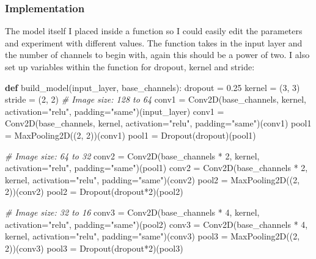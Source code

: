 \documentclass[11pt]{article}
\newenvironment{Shaded}{}{}
\newcommand{\KeywordTok}[1]{\textcolor[rgb]{0.00,0.44,0.13}{\textbf{{#1}}}}
\newcommand{\DecValTok}[1]{\textcolor[rgb]{0.25,0.63,0.44}{{#1}}}
\newcommand{\FloatTok}[1]{\textcolor[rgb]{0.25,0.63,0.44}{{#1}}}
\newcommand{\StringTok}[1]{\textcolor[rgb]{0.25,0.44,0.63}{{#1}}}
\newcommand{\CommentTok}[1]{\textcolor[rgb]{0.38,0.63,0.69}{\textit{{#1}}}}
\newcommand{\NormalTok}[1]{{#1}}
\newcommand{\OperatorTok}[1]{\textcolor[rgb]{0.40,0.40,0.40}{{#1}}}
\begin{document}
\subsubsection{Implementation}\label{implementation}

The model itself I placed inside a function so I could easily edit the
parameters and experiment with different values. The function takes in
the input layer and the number of channels to begin with, again this
should be a power of two. I also set up variables within the function
for dropout, kernel and stride:

\begin{Shaded}
\begin{Highlighting}[]
\KeywordTok{def}\NormalTok{ build_model(input_layer, base_channels):}
\NormalTok{    dropout }\OperatorTok{=} \FloatTok{0.25}
\NormalTok{    kernel }\OperatorTok{=}\NormalTok{ (}\DecValTok{3}\NormalTok{, }\DecValTok{3}\NormalTok{)}
\NormalTok{    stride }\OperatorTok{=}\NormalTok{ (}\DecValTok{2}\NormalTok{, }\DecValTok{2}\NormalTok{)}
    \CommentTok{# Image size: 128 to 64}
\NormalTok{    conv1 }\OperatorTok{=}\NormalTok{ Conv2D(base_channels, kernel, activation}\OperatorTok{=}\StringTok{"relu"}\NormalTok{, padding}\OperatorTok{=}\StringTok{"same"}\NormalTok{)(input_layer)}
\NormalTok{    conv1 }\OperatorTok{=}\NormalTok{ Conv2D(base_channels, kernel, activation}\OperatorTok{=}\StringTok{"relu"}\NormalTok{, padding}\OperatorTok{=}\StringTok{"same"}\NormalTok{)(conv1)}
\NormalTok{    pool1 }\OperatorTok{=}\NormalTok{ MaxPooling2D((}\DecValTok{2}\NormalTok{, }\DecValTok{2}\NormalTok{))(conv1)}
\NormalTok{    pool1 }\OperatorTok{=}\NormalTok{ Dropout(dropout)(pool1)}

    \CommentTok{# Image size: 64 to 32}
\NormalTok{    conv2 }\OperatorTok{=}\NormalTok{ Conv2D(base_channels }\OperatorTok{*} \DecValTok{2}\NormalTok{, kernel, activation}\OperatorTok{=}\StringTok{"relu"}\NormalTok{, padding}\OperatorTok{=}\StringTok{"same"}\NormalTok{)(pool1)}
\NormalTok{    conv2 }\OperatorTok{=}\NormalTok{ Conv2D(base_channels }\OperatorTok{*} \DecValTok{2}\NormalTok{, kernel, activation}\OperatorTok{=}\StringTok{"relu"}\NormalTok{, padding}\OperatorTok{=}\StringTok{"same"}\NormalTok{)(conv2)}
\NormalTok{    pool2 }\OperatorTok{=}\NormalTok{ MaxPooling2D((}\DecValTok{2}\NormalTok{, }\DecValTok{2}\NormalTok{))(conv2)}
\NormalTok{    pool2 }\OperatorTok{=}\NormalTok{ Dropout(dropout}\OperatorTok{*}\DecValTok{2}\NormalTok{)(pool2)}

    \CommentTok{# Image size: 32 to 16}
\NormalTok{    conv3 }\OperatorTok{=}\NormalTok{ Conv2D(base_channels }\OperatorTok{*} \DecValTok{4}\NormalTok{, kernel, activation}\OperatorTok{=}\StringTok{"relu"}\NormalTok{, padding}\OperatorTok{=}\StringTok{"same"}\NormalTok{)(pool2)}
\NormalTok{    conv3 }\OperatorTok{=}\NormalTok{ Conv2D(base_channels }\OperatorTok{*} \DecValTok{4}\NormalTok{, kernel, activation}\OperatorTok{=}\StringTok{"relu"}\NormalTok{, padding}\OperatorTok{=}\StringTok{"same"}\NormalTok{)(conv3)}
\NormalTok{    pool3 }\OperatorTok{=}\NormalTok{ MaxPooling2D((}\DecValTok{2}\NormalTok{, }\DecValTok{2}\NormalTok{))(conv3)}
\NormalTok{    pool3 }\OperatorTok{=}\NormalTok{ Dropout(dropout}\OperatorTok{*}\DecValTok{2}\NormalTok{)(pool3)}


\end{Highlighting}
\end{Shaded}
\end{document}
